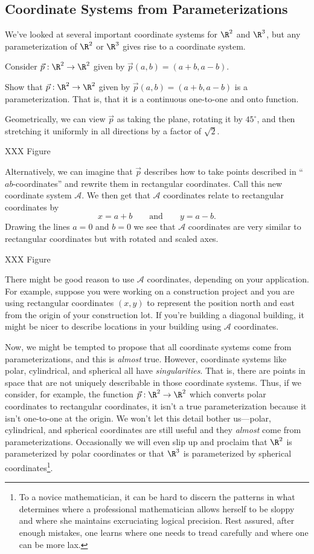 \subsection{Coordinate Systems from Parameterizations}
We've looked at several important coordinate systems for $\R^2$ and $\R^3$,
but any parameterization of $\R^2$ or $\R^3$ gives rise to a coordinate system.

Consider $\vec p:\R^2\to\R^2$ given by $\vec p(a,b)=(a+b,a-b)$.  

\begin{exercise}
	Show that $\vec p:\R^2\to\R^2$ given by $\vec p(a,b)=(a+b,a-b)$ is
	a parameterization.  That is, that it is a continuous 
	one-to-one and onto function.
\end{exercise}

Geometrically, we can view $\vec p$ as taking the plane, rotating it by $45^\circ$,
and then
stretching it uniformly in all directions by a factor of $\sqrt{2}$.

XXX Figure

Alternatively, we can imagine that $\vec p$ describes how to take points described
in ``$ab$-coordinates'' and rewrite them in rectangular coordinates.  Call this new coordinate
system $\mathcal A$. We then get that
$\mathcal A$ coordinates relate to rectangular coordinates by
\[
	x=a+b\qquad\text{and}\qquad y=a-b.
\]
Drawing the lines $a=0$ and $b=0$ we see that $\mathcal A$ coordinates are very similar to
rectangular coordinates but with rotated and scaled axes.

XXX Figure

There might be good reason to use $\mathcal A$ coordinates, depending on your application.
For example, suppose you were working on a construction project and you are using rectangular
coordinates $(x,y)$ to represent the position north and east from the origin of your construction
lot.  If you're building a diagonal building, it might be nicer to describe locations in your building
using $\mathcal A$ coordinates.

\bigskip

Now, we might be tempted to propose that all coordinate systems come from parameterizations,
and this is \emph{almost} true.  However, coordinate systems like polar, cylindrical, and spherical
all have \emph{singularities}.  That is, there are points in space that are not uniquely
describable in those coordinate systems.  Thus, if we consider, for example, the function
$\vec p:\R^2\to\R^2$ which converts polar coordinates to rectangular coordinates, it isn't a true
parameterization because it isn't one-to-one at the origin.  We won't let this detail bother us---polar,
cylindrical, and spherical coordinates are still useful and they \emph{almost} come from parameterizations.
Occasionally we will even slip up and proclaim that $\R^2$ is parameterized by polar coordinates
or that $\R^3$ is parameterized by spherical coordinates\footnote{
	To a novice mathematician, it can be hard to discern the 
	patterns in what determines where a professional mathematician allows
	herself to be sloppy and where she maintains excruciating logical precision.
	Rest assured, after enough mistakes, one learns where one needs to tread carefully
	and where one can be more lax.
}.


\begin{exercises}
\end{exercises}
